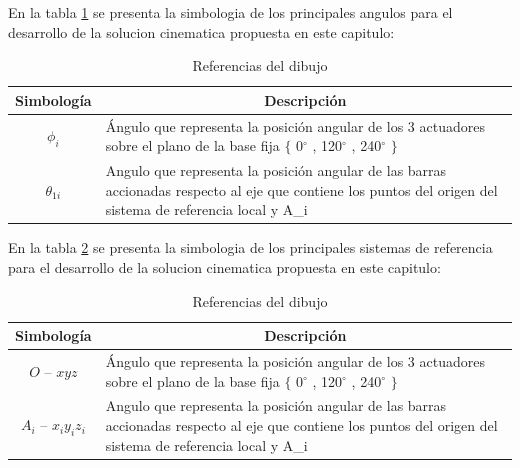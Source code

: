     En la tabla \ref{tab:cap4_tabla_8} se presenta la simbologia de los principales angulos para el desarrollo de la solucion cinematica propuesta en este capitulo: 
    
        \begingroup
            \renewcommand{\arraystretch}{1.5}
            \begin{table}[H]
            \centering
            \begin{tabular}{c m{12cm}}
               \hline
               \textbf{Simbología}  & \multicolumn{1}{c}{\textbf{Descripción}}  \\\hline
            \hline            
             $\phi _{i}$ & Ángulo que representa la posición angular de los 3 actuadores sobre el plano de la base fija $ \{ $ 0$ ^{\circ} $ , 120$ ^{\circ} $ , 240$ ^{\circ} $ $ \} $ \\
            \hline
             $ \theta _{1i}$ & Angulo que representa la posición angular de las barras accionadas respecto al eje que contiene los puntos del origen del sistema de referencia local y A_{i}  \\
            \hline
            \end{tabular}
            \caption{Referencias del dibujo}
           \label{tab:cap4_tabla_8}
        \end{table}
        \endgroup    
    
        \newpage
    
        En la tabla \ref{tab:cap4_tabla_9} se presenta la simbologia de los principales sistemas de referencia para el desarrollo de la solucion cinematica propuesta en este capitulo: 
        
        \begingroup
            \renewcommand{\arraystretch}{1.5}
            \begin{table}[H]
            \centering
            \begin{tabular}{c m{12cm}}
               \hline
               \textbf{Simbología}  & \multicolumn{1}{c}{\textbf{Descripción}}  \\\hline
            \hline            
             $O$ – $xyz$ & Ángulo que representa la posición angular de los 3 actuadores sobre el plano de la base fija $ \{ $ 0$ ^{\circ} $ , 120$ ^{\circ} $ , 240$ ^{\circ} $ $ \} $ \\
            \hline
             $  A_{i}$ – $x_{i}y_{i}z_{i}$ & Angulo que representa la posición angular de las barras accionadas respecto al eje que contiene los puntos del origen del sistema de referencia local y A_{i}  \\
            \hline
            \end{tabular}
            \caption{Referencias del dibujo}
           \label{tab:cap4_tabla_9}
        \end{table}
        \endgroup        
        
